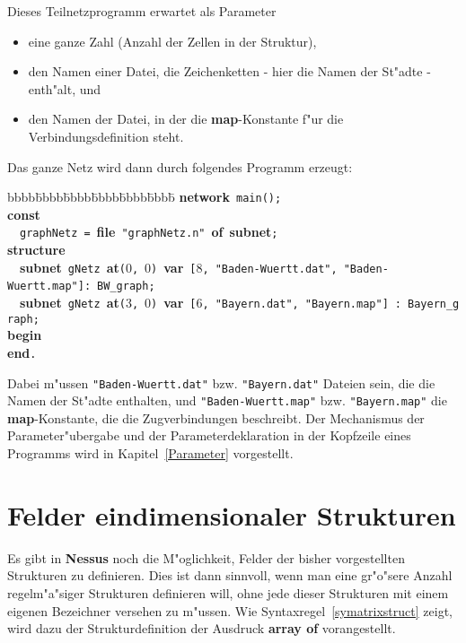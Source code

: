 Dieses Teilnetzprogramm erwartet als Parameter 

\begin{itemize}
  \item eine ganze Zahl (Anzahl der Zellen in der Struktur),
  \item den Namen einer Datei, die Zeichenketten - hier die Namen der St"adte - enth"alt, und
  \item den Namen der Datei, in der die {\bf map}-Konstante f"ur die Verbindungsdefinition steht.
\end{itemize}
Das ganze Netz wird dann durch folgendes Programm erzeugt:
\begin{tabbing}bbbb\=bbbb\=bbbb\=bbbb\=bbbb\=bbbb\=\kill
{\bf network}~\verb&main&\verb&(&\verb&)&\verb&;&\\
{\bf const}\\
~~\verb&graphNetz&~\verb&=&~{\bf file}~\verb&"graphNetz.n"&~{\bf of}~{\bf subnet}\verb&;&\\[.15cm]
{\bf structure}\\
~~{\bf subnet}~\verb&gNetz&~{\bf at}\verb&(&0\verb&,&~0\verb&)&~{\bf var}~\verb&[&8\verb&,&~\verb&"Baden-Wuertt.dat"&\verb&,&~\verb&"Baden-Wuertt.map"&\verb&]&\verb&:&~\verb&BW_graph&\verb&;&\\
~~{\bf subnet}~\verb&gNetz&~{\bf at}\verb&(&3\verb&,&~0\verb&)&~{\bf var}~\verb&[&6\verb&,&~\verb&"Bayern.dat"&\verb&,&~\verb&"Bayern.map"&\verb&]&~\verb&:&~\verb&Bayern_graph&\verb&;&\\[.15cm]
{\bf begin}\\
{\bf end}\verb&.&
\end{tabbing}

Dabei m"ussen \verb&"Baden-Wuertt.dat"& bzw. \verb&"Bayern.dat"&
Dateien sein, die die Namen der St"adte enthalten, und
\verb&"Baden-Wuertt.map"& bzw. \verb&"Bayern.map"& die {\bf
map}-Konstante, die die Zugverbindungen beschreibt.  Der Mechanismus
der Parameter"ubergabe und der Parameterdeklaration
 in der Kopfzeile eines
Programms wird in Kapitel~\ref{Parameter} vorgestellt.



\section{Felder eindimensionaler Strukturen}
\label{Matrizen}

Es gibt in {\bf Nessus} noch die M"oglichkeit, Felder der bisher
vorgestellten Strukturen zu
definieren. Dies ist dann sinnvoll, wenn man eine gr"o"sere Anzahl
regelm"a"siger Strukturen definieren will, ohne jede dieser Strukturen
mit einem eigenen Bezeichner versehen zu m"ussen.
Wie Syntaxregel~\ref{symatrixstruct} zeigt, wird dazu der
Strukturdefinition der Ausdruck {\bf array
of} vorangestellt.

